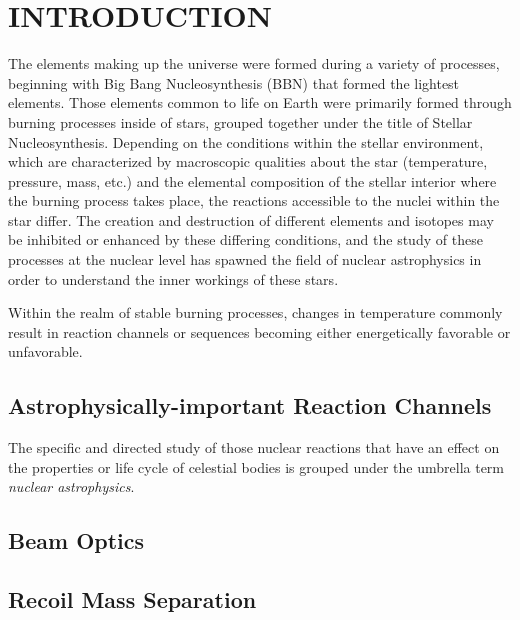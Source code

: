 \chapter{INTRODUCTION}

The elements making up the universe were formed during a variety of processes,
beginning with Big Bang Nucleosynthesis (BBN) that formed the lightest
elements. Those elements common to life on Earth were primarily formed through
burning processes inside of stars, grouped together under the title of
Stellar Nucleosynthesis. Depending on the conditions within the stellar
environment, which are characterized by macroscopic qualities about the star
(temperature, pressure, mass, etc.) and the elemental composition of the
stellar interior where the burning process takes place, the reactions
accessible to the nuclei within the star differ. The creation and destruction
of different elements and isotopes may be inhibited or enhanced by these
differing conditions, and the study of these processes at the nuclear level
has spawned the field of nuclear astrophysics in order to understand the inner
workings of these stars.

Within the realm of stable burning processes, changes in temperature commonly
result in reaction channels or sequences becoming either energetically
favorable or unfavorable.



\section{Astrophysically-important Reaction Channels}



The specific and directed study of those nuclear reactions that have an effect
on the properties or life cycle of celestial bodies is grouped under the
umbrella term \emph{nuclear astrophysics}.


\section{Beam Optics}



\section{Recoil Mass Separation}

